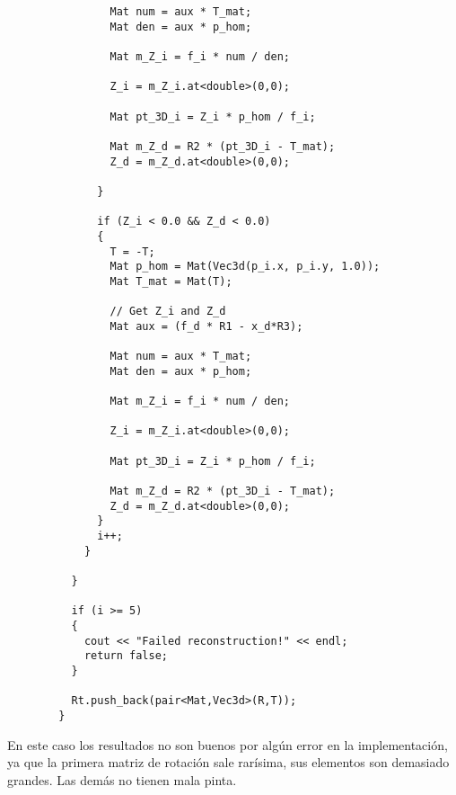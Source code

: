\documentclass[a4paper, 11pt]{article}
\theoremstyle{definition}
\begin{document}
\begin{lstlisting}
                Mat num = aux * T_mat;
                Mat den = aux * p_hom;

                Mat m_Z_i = f_i * num / den;

                Z_i = m_Z_i.at<double>(0,0);

                Mat pt_3D_i = Z_i * p_hom / f_i;

                Mat m_Z_d = R2 * (pt_3D_i - T_mat);
                Z_d = m_Z_d.at<double>(0,0);

              }

              if (Z_i < 0.0 && Z_d < 0.0)
              {
                T = -T;
                Mat p_hom = Mat(Vec3d(p_i.x, p_i.y, 1.0));
                Mat T_mat = Mat(T);

                // Get Z_i and Z_d
                Mat aux = (f_d * R1 - x_d*R3);

                Mat num = aux * T_mat;
                Mat den = aux * p_hom;

                Mat m_Z_i = f_i * num / den;

                Z_i = m_Z_i.at<double>(0,0);

                Mat pt_3D_i = Z_i * p_hom / f_i;

                Mat m_Z_d = R2 * (pt_3D_i - T_mat);
                Z_d = m_Z_d.at<double>(0,0);
              }
              i++;
            }

          }

          if (i >= 5)
          {
            cout << "Failed reconstruction!" << endl;
            return false;
          }

          Rt.push_back(pair<Mat,Vec3d>(R,T));
        }
      \end{lstlisting}

      En este caso los resultados no son buenos por algún error en la implementación,
      ya que la primera matriz de rotación sale rarísima, sus elementos son demasiado
      grandes. Las demás no tienen mala pinta.
\end{document}
